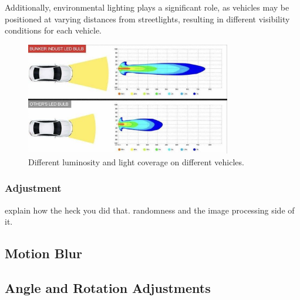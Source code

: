 Additionally, environmental lighting plays a significant role, as vehicles may be positioned at varying distances 
from streetlights, resulting in different visibility conditions for each vehicle.

\begin{figure}[H]
    \centering
    \includegraphics[width=0.8\textwidth]{images/figure10.png}
    \caption{Different luminosity and light coverage on different vehicles.}
    \label{fig:fig9}
  \end{figure}

  \subsubsection{Adjustment}

  explain how the heck you did that. 
  randomness and the image processing side of it. 

\subsection{Motion Blur}

\subsection{Angle and Rotation Adjustments}





